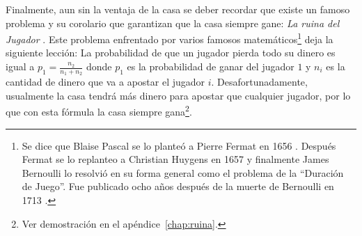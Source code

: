 \begin{table}[ht]
\centering
{}
\caption{Ventajas de la casa para juegos populares de casino \cite{hannum2005practical}}
\label{ventaja-casa}
\end{table}

Finalmente, aun sin la ventaja de la casa se deber recordar que existe un famoso problema y su corolario que garantizan que la casa siempre gane: \emph{La ruina del Jugador} \cite[p.~95-99]{ross2006first}. Este problema enfrentado por varios famosos matemáticos\footnote{Se dice que Blaise Pascal se lo planteó a Pierre Fermat en 1656 \cite{edwards1983pascal}. Después Fermat se lo replanteo a Christian Huygens en 1657 y finalmente James Bernoulli lo resolvió en su forma general como el problema de la ``Duración de Juego''. Fue publicado ocho años después de la muerte de Bernoulli en 1713 \cite[p.~98]{ross2006first}.} deja la siguiente lección: La probabilidad de que un jugador pierda todo su dinero es igual a  $p_1 = \frac{n_2}{n_1 + n_2}$ donde $p_1$ es la probabilidad de ganar del jugador $1$ y $n_i$ es la cantidad de dinero que va a apostar el jugador $i$. Desafortunadamente, usualmente la casa tendrá más dinero para apostar que cualquier jugador, por lo que con esta fórmula la casa siempre gana\footnote{Ver demostración en el apéndice~\ref{chap:ruina}.}.


